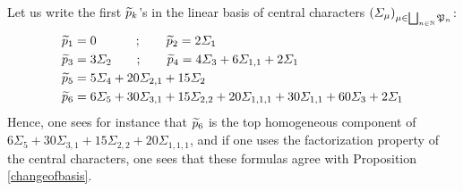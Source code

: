 \documentclass[10pt]{amsart}
\begin{document}
\begin{examples}
Let us write the first $\widetilde{p}_{k}$'s in the linear basis of central characters $(\varSigma_{\mu})_{\mu \in \bigsqcup_{n \in \mathbb{N}}\mathfrak{P}_{n}}$:
\begin{align*}
\widetilde{p}_{1}&=0\quad\qquad\,;\qquad\widetilde{p}_{2}=2\varSigma_{1}\\
\widetilde{p}_{3}&=3\varSigma_{2}\qquad;\qquad\widetilde{p}_{4}=4\varSigma_{3}+6\varSigma_{1,1}+2\varSigma_{1}\\
\widetilde{p}_{5}&=5\varSigma_{4}+20\varSigma_{2,1}+15\varSigma_{2}\\
\widetilde{p}_{6}&=6\varSigma_{5}+30\varSigma_{3,1}+15\varSigma_{2,2}+20\varSigma_{1,1,1}+30\varSigma_{1,1}+60\varSigma_{3}+2\varSigma_{1}
\end{align*}
Hence, one sees for instance that $\widetilde{p}_{6}$ is the top homogeneous component of $6\varSigma_{5}+30\varSigma_{3,1}+15\varSigma_{2,2}+20\varSigma_{1,1,1}$, and if one uses the factorization property of the central characters, one sees that these formulas agree with Proposition \ref{changeofbasis}.
\end{examples}
\bigskip
\bigskip
\end{document}
